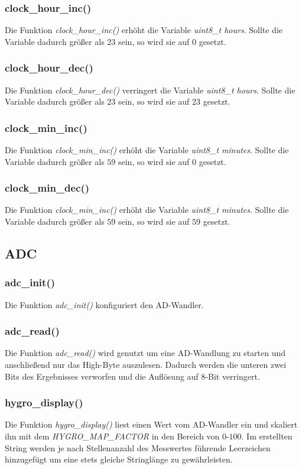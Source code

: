 \documentclass[10pt]{scrartcl}
\begin{document}
\subsubsection{clock\_hour\_inc()}
Die Funktion \textit{clock\_hour\_inc()} erhöht die Variable \textit{uint8\_t hours}. Sollte die Variable dadurch größer als \(23\) sein, so wird sie auf \(0\) gesetzt.
\subsubsection{clock\_hour\_dec()}
Die Funktion \textit{clock\_hour\_dec()} verringert die Variable \textit{uint8\_t hours}. Sollte die Variable dadurch größer als \(23\) sein, so wird sie auf \(23\) gesetzt.
\subsubsection{clock\_min\_inc()}
Die Funktion \textit{clock\_min\_inc()} erhöht die Variable \textit{uint8\_t minutes}. Sollte die Variable dadurch größer als \(59\) sein, so wird sie auf \(0\) gesetzt.
\subsubsection{clock\_min\_dec()}
Die Funktion \textit{clock\_min\_inc()} erhöht die Variable \textit{uint8\_t minutes}. Sollte die Variable dadurch größer als \(59\) sein, so wird sie auf \(59\) gesetzt.
\subsection{ADC}
\subsubsection{adc\_init()}
Die Funktion \textit{adc\_init()} konfiguriert den AD-Wandler.
\subsubsection{adc\_read()}
Die Funktion \textit{adc\_read()} wird genutzt um eine AD-Wandlung zu starten und anschließend nur das High-Byte auszulesen. Dadurch werden die unteren zwei Bits des Ergebnisses verworfen und die Auflösung auf 8-Bit verringert.
\subsubsection{hygro\_display()}
Die Funktion \textit{hygro\_display()} liest einen Wert vom AD-Wandler ein und skaliert ihn mit dem \textit{HYGRO\_MAP\_FACTOR} in den Bereich von \(0\)-\(100\). Im erstellten String werden je nach Stellenanzahl des Messwertes führende Leerzeichen hinzugefügt um eine stets gleiche Stringlänge zu gewährleisten.
\end{document}
